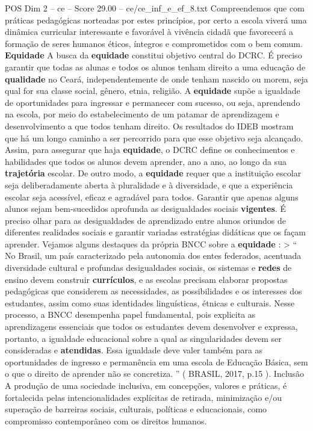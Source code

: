 \begin{textsample}{POS Dim 2 – ce – Score 29.00 – ce/ce\_inf\_e\_ef\_8.txt}
Compreendemos que com práticas pedagógicas norteadas por estes princípios, por certo a escola viverá uma dinâmica curricular interessante e favorável à vivência cidadã que favorecerá a formação de seres humanos éticos, íntegros e comprometidos com o bem comum. \textbf{Equidade} A busca da \textbf{equidade} constitui objetivo central do DCRC.
É preciso garantir que todas as alunas e todos os alunos tenham direito a uma educação de \textbf{qualidade} no Ceará, independentemente de onde tenham nascido ou morem, seja qual for sua classe social, gênero, etnia, religião.
A \textbf{equidade} supõe a igualdade de oportunidades para ingressar e permanecer com sucesso, ou seja, aprendendo na escola, por meio do estabelecimento de um patamar de aprendizagem e desenvolvimento a que todos tenham direito.
Os resultados do IDEB mostram que há um longo caminho a ser percorrido para que esse objetivo seja alcançado.
Assim, para assegurar que haja \textbf{equidade}, o DCRC define os conhecimentos e habilidades que todos os alunos devem aprender, ano a ano, ao longo da sua \textbf{trajetória} escolar.
De outro modo, a \textbf{equidade} requer que a instituição escolar seja deliberadamente aberta à pluralidade e à diversidade, e que a experiência escolar seja acessível, eficaz e agradável para todos.
Garantir que apenas alguns alunos sejam bem-sucedidos aprofunda as desigualdades sociais \textbf{vigentes}.
É preciso olhar para as desigualdades de aprendizado entre alunos oriundos de diferentes realidades sociais e garantir variadas estratégias didáticas que os façam aprender.
Vejamos alguns destaques da própria BNCC sobre a \textbf{equidade} : > “ No Brasil, um país caracterizado pela autonomia dos entes federados, acentuada diversidade cultural e profundas desigualdades sociais, os sistemas e \textbf{redes} de ensino devem construir \textbf{currículos}, e as escolas precisam elaborar propostas pedagógicas que considerem as necessidades, as possibilidades e os interesses dos estudantes, assim como suas identidades linguísticas, étnicas e culturais.
Nesse processo, a BNCC desempenha papel fundamental, pois explicita as aprendizagens essenciais que todos os estudantes devem desenvolver e expressa, portanto, a igualdade educacional sobre a qual as singularidades devem ser consideradas e \textbf{atendidas}.
Essa igualdade deve valer também para as oportunidades de ingresso e permanência em uma escola de Educação Básica, sem o que o direito de aprender não se concretiza. ” ( BRASIL, 2017, p.15 ).
Inclusão A produção de uma sociedade inclusiva, em concepções, valores e práticas, é fortalecida pelas intencionalidades explícitas de retirada, minimização e/ou superação de barreiras sociais, culturais, políticas e educacionais, como compromisso contemporâneo com os direitos humanos.

\end{textsample}
